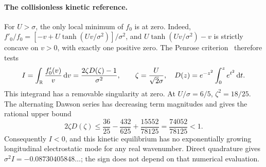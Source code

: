 \paragraph{The collisionless kinetic reference.}
For $U>\sigma$, the only local minimum of $f_0$ is at zero. Indeed,
$f'_0/f_0=[-v+U\tanh(Uv/\sigma^2)]/\sigma^2$, and
$U\tanh(Uv/\sigma^2)-v$ is strictly concave on $v>0$, with exactly one
positive zero. The Penrose criterion~\cite{penrose1960} therefore tests
\begin{equation}
 I=\int_{\mathbb R}\frac{f'_0(v)}v\,\mathrm d v
 =\frac{2\zeta D(\zeta)-1}{\sigma^2},
 \qquad
 \zeta=\frac{U}{\sqrt2\sigma},\quad
 D(z)=e^{-z^2}\int_0^z e^{t^2}\,\mathrm d t.
 \label{eq:penrose-integral}
\end{equation}
This integrand has a removable singularity at zero. At $U/\sigma=6/5$,
$\zeta^2=18/25$. The alternating Dawson series has decreasing term magnitudes
and gives the rational upper bound
\begin{equation}
 2\zeta D(\zeta)
 \leq \frac{36}{25}-\frac{432}{625}+\frac{15552}{78125}
 =\frac{74052}{78125}<1.
 \label{eq:penrose-rational}
\end{equation}
Consequently $I<0$, and this kinetic equilibrium has no exponentially growing
longitudinal electrostatic mode for any real wavenumber. Direct quadrature gives
$\sigma^2 I=-0.08730405848\ldots$; the sign does not depend on that numerical
evaluation.

